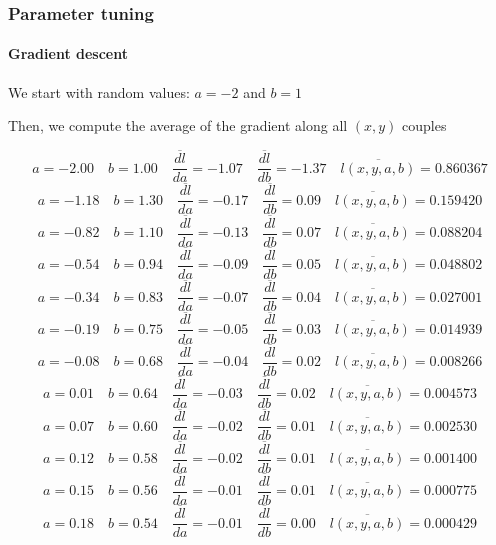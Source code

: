\documentclass[9pt]{beamer}
\begin{document}
\begin{frame}
  \frametitle{Parameter tuning}

  \framesubtitle{Gradient descent}

  We start with random values: $a = -2$ and $b = 1$

  \begin{center}
    \scalebox{0.7}{
      
    }
  \end{center}

  Then, we compute the average of the gradient along all $(x, y)$ couples

  \begin{overprint}
     \[ a = -2.00 \quad b = 1.00 \quad \overline{\frac{dl}{da}} = -1.07 \quad \overline{\frac{dl}{db}} = -1.37 \quad \overline{l(x, y, a, b)} = 0.860367 \]
     \[ a = -1.18 \quad b = 1.30 \quad \overline{\frac{dl}{da}} = -0.17 \quad \overline{\frac{dl}{db}} = 0.09 \quad \overline{l(x, y, a, b)} = 0.159420 \]
     \[ a = -0.82 \quad b = 1.10 \quad \overline{\frac{dl}{da}} = -0.13 \quad \overline{\frac{dl}{db}} = 0.07 \quad \overline{l(x, y, a, b)} = 0.088204 \]
     \[ a = -0.54 \quad b = 0.94 \quad \overline{\frac{dl}{da}} = -0.09 \quad \overline{\frac{dl}{db}} = 0.05 \quad \overline{l(x, y, a, b)} = 0.048802 \]
     \[ a = -0.34 \quad b = 0.83 \quad \overline{\frac{dl}{da}} = -0.07 \quad \overline{\frac{dl}{db}} = 0.04 \quad \overline{l(x, y, a, b)} = 0.027001 \]
     \[ a = -0.19 \quad b = 0.75 \quad \overline{\frac{dl}{da}} = -0.05 \quad \overline{\frac{dl}{db}} = 0.03 \quad \overline{l(x, y, a, b)} = 0.014939 \]
     \[ a = -0.08 \quad b = 0.68 \quad \overline{\frac{dl}{da}} = -0.04 \quad \overline{\frac{dl}{db}} = 0.02 \quad \overline{l(x, y, a, b)} = 0.008266 \]
     \[ a = 0.01 \quad b = 0.64 \quad \overline{\frac{dl}{da}} = -0.03 \quad \overline{\frac{dl}{db}} = 0.02 \quad \overline{l(x, y, a, b)} = 0.004573 \]
     \[ a = 0.07 \quad b = 0.60 \quad \overline{\frac{dl}{da}} = -0.02 \quad \overline{\frac{dl}{db}} = 0.01 \quad \overline{l(x, y, a, b)} = 0.002530 \]
     \[ a = 0.12 \quad b = 0.58 \quad \overline{\frac{dl}{da}} = -0.02 \quad \overline{\frac{dl}{db}} = 0.01 \quad \overline{l(x, y, a, b)} = 0.001400 \]
     \[ a = 0.15 \quad b = 0.56 \quad \overline{\frac{dl}{da}} = -0.01 \quad \overline{\frac{dl}{db}} = 0.01 \quad \overline{l(x, y, a, b)} = 0.000775 \]
     \[ a = 0.18 \quad b = 0.54 \quad \overline{\frac{dl}{da}} = -0.01 \quad \overline{\frac{dl}{db}} = 0.00 \quad \overline{l(x, y, a, b)} = 0.000429 \]

\end{overprint}
\end{frame}
\end{document}
